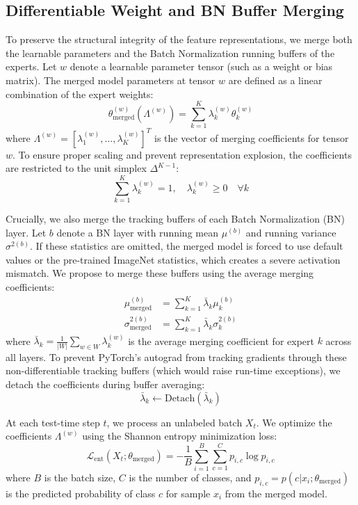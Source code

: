 \documentclass{article}
\theoremstyle{plain}
\theoremstyle{definition}
\theoremstyle{remark}
\begin{document}
\subsection{Differentiable Weight and BN Buffer Merging}
To preserve the structural integrity of the feature representations, we merge both the learnable parameters and the Batch Normalization running buffers of the experts. Let $w$ denote a learnable parameter tensor (such as a weight or bias matrix). The merged model parameters at tensor $w$ are defined as a linear combination of the expert weights:
\begin{equation}
\theta_{\text{merged}}^{(w)}(\Lambda^{(w)}) = \sum_{k=1}^K \lambda_k^{(w)} \theta_k^{(w)}
\end{equation}
where $\Lambda^{(w)} = [\lambda_1^{(w)}, \dots, \lambda_K^{(w)}]^T$ is the vector of merging coefficients for tensor $w$. To ensure proper scaling and prevent representation explosion, the coefficients are restricted to the unit simplex $\Delta^{K-1}$:
\begin{equation}
\sum_{k=1}^K \lambda_k^{(w)} = 1, \quad \lambda_k^{(w)} \geq 0 \quad \forall k
\end{equation}

Crucially, we also merge the tracking buffers of each Batch Normalization (BN) layer. Let $b$ denote a BN layer with running mean $\mu^{(b)}$ and running variance $\sigma^{2(b)}$. If these statistics are omitted, the merged model is forced to use default values or the pre-trained ImageNet statistics, which creates a severe activation mismatch. We propose to merge these buffers using the average merging coefficients:
\begin{align}
\mu_{\text{merged}}^{(b)} &= \sum_{k=1}^K \bar{\lambda}_k \mu_k^{(b)} \\
\sigma_{\text{merged}}^{2(b)} &= \sum_{k=1}^K \bar{\lambda}_k \sigma_k^{2(b)}
\end{align}
where $\bar{\lambda}_k = \frac{1}{|W|} \sum_{w \in W} \lambda_k^{(w)}$ is the average merging coefficient for expert $k$ across all layers. To prevent PyTorch's autograd from tracking gradients through these non-differentiable tracking buffers (which would raise run-time exceptions), we detach the coefficients during buffer averaging:
\begin{equation}
\bar{\lambda}_k \leftarrow \text{Detach}(\bar{\lambda}_k)
\end{equation}

At each test-time step $t$, we process an unlabeled batch $X_t$. We optimize the coefficients $\Lambda^{(w)}$ using the Shannon entropy minimization loss:
\begin{equation}
\mathcal{L}_{\text{ent}}(X_t; \theta_{\text{merged}}) = -\frac{1}{B} \sum_{i=1}^B \sum_{c=1}^C p_{i,c} \log p_{i,c}
\end{equation}
where $B$ is the batch size, $C$ is the number of classes, and $p_{i,c} = p(c | x_i; \theta_{\text{merged}})$ is the predicted probability of class $c$ for sample $x_i$ from the merged model.
\end{document}
